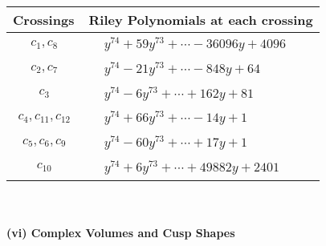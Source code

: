 \documentclass[1p]{elsarticle_modified}
\theoremstyle{definition}
\begin{document}
\begin{tabular}{m{50pt}|m{274pt}}
Crossings & \hspace{64pt}Riley Polynomials at each crossing \\
\hline $$\begin{aligned}c_{1},c_{8}\end{aligned}$$&$\begin{aligned}
&y^{74}+59 y^{73}+\cdots-36096 y+4096
\end{aligned}$\\
\hline $$\begin{aligned}c_{2},c_{7}\end{aligned}$$&$\begin{aligned}
&y^{74}-21 y^{73}+\cdots-848 y+64
\end{aligned}$\\
\hline $$\begin{aligned}c_{3}\end{aligned}$$&$\begin{aligned}
&y^{74}-6 y^{73}+\cdots+162 y+81
\end{aligned}$\\
\hline $$\begin{aligned}c_{4},c_{11},c_{12}\end{aligned}$$&$\begin{aligned}
&y^{74}+66 y^{73}+\cdots-14 y+1
\end{aligned}$\\
\hline $$\begin{aligned}c_{5},c_{6},c_{9}\end{aligned}$$&$\begin{aligned}
&y^{74}-60 y^{73}+\cdots+17 y+1
\end{aligned}$\\
\hline $$\begin{aligned}c_{10}\end{aligned}$$&$\begin{aligned}
&y^{74}+6 y^{73}+\cdots+49882 y+2401
\end{aligned}$\\
\hline
\end{tabular}\\~\\
\newpage\flushleft \textbf{(vi) Complex Volumes and Cusp Shapes}
\end{document}
